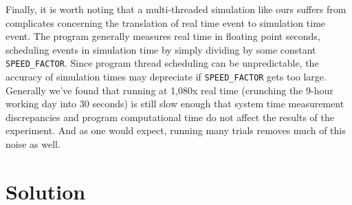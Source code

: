 \documentclass{article}
\begin{document}
\begin{multicols}{2}
Finally, it is worth noting that a multi-threaded simulation like ours suffers from complicates concerning the translation of real time event to simulation time event. The program generally measures real time in floating point seconds, scheduling events in simulation time by simply dividing by some constant \texttt{SPEED\_FACTOR}. Since program thread scheduling can be unpredictable, the accuracy of simulation times may depreciate if \texttt{SPEED\_FACTOR} gets too large. Generally we've found that running at 1,080x real time (crunching the 9-hour working day into 30 seconds) is still slow enough that system time measurement discrepancies and program computational time do not affect the results of the experiment. And as one would expect, running many trials removes much of this noise as well.

\section*{Solution}


\end{multicols}
\end{document}
